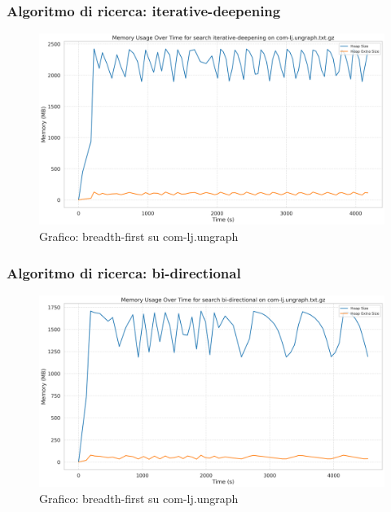 \documentclass{article}
\begin{document}
\subsubsection{Algoritmo di ricerca: iterative-deepening}
\begin{figure}[h]\centering
\includegraphics[width=\textwidth]{../plots/com-lj.ungraph_iterative-deepening.png}
\caption{Grafico: breadth-first su com-lj.ungraph}
\end{figure}
\subsubsection{Algoritmo di ricerca: bi-directional}
\begin{figure}[h]\centering
\includegraphics[width=\textwidth]{../plots/com-lj.ungraph_bi-directional.png}
\caption{Grafico: breadth-first su com-lj.ungraph}
\end{figure}
\end{document}
